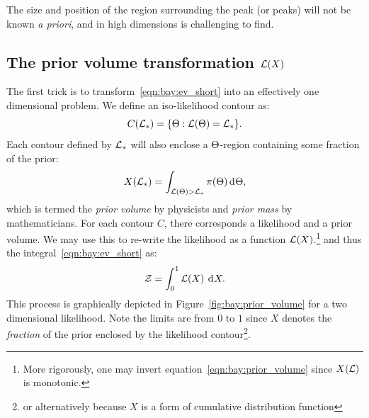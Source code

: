 The size and position of the region surrounding the peak (or peaks) will not be known {\em a priori}, and in high dimensions is challenging to find.  

\subsection{The prior volume transformation $\mathcal{L}(X)$}
The first trick is to transform~\eqref{eqn:bay:ev_short} into an effectively one dimensional problem. We define an iso-likelihood contour as:
\begin{equation}
  C(\mathcal{L}_\ast) = \{\Theta : \mathcal{L}(\Theta)=\mathcal{L}_\ast \}.
  \label{eqn:bay:contour_def}
\end{equation}
Each contour defined by $\mathcal{L}_\ast$ will also enclose a $\Theta$-region containing some fraction of the prior:
\begin{equation}
  X(\mathcal{L}_\ast) = \int_{\mathcal{L}(\Theta)>\mathcal{L}_\ast} \pi(\Theta) \operatorname{d}^{}\!{\Theta},
  \label{eqn:bay:prior_volume}
\end{equation}
which is termed the {\em prior volume\/} by physicists and {\em prior mass\/} by mathematicians. For each contour $C$, there corresponds a likelihood and a prior volume. We may use this to re-write the likelihood as a function $\mathcal{L}(X)$.\footnote{More rigorously, one may invert equation~\protect\eqref{eqn:bay:prior_volume} since $X(\mathcal{L})$ is monotonic.} and thus the integral~\eqref{eqn:bay:ev_short} as:
\begin{equation}
  \mathcal{Z} = \int_0^1 \mathcal{L}(X)\:\operatorname{d}^{}\!{X}.
  \label{eqn:bay:ev_X}
\end{equation}
This process is graphically depicted in Figure~\ref{fig:bay:prior_volume} for a two dimensional likelihood. Note the limits are from $0$ to $1$ since $X$ denotes the {\em fraction\/} of the prior enclosed by the likelihood contour\footnote{or alternatively because $X$ is a form of cumulative distribution function}.
%
